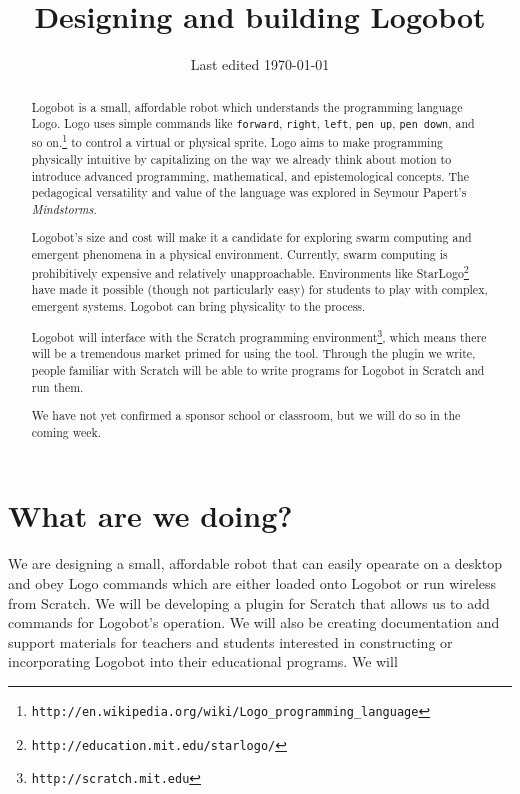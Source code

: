 \documentclass[11pt]{article}
\title{Designing and building Logobot}
\author{}
\date{Last edited \today}
\begin{document}
\maketitle
\begin{abstract}
Logobot is a small, affordable robot which understands the programming language Logo.  Logo uses simple commands like \texttt{forward}, \texttt{right}, \texttt{left}, \texttt{pen up}, \texttt{pen down}, and so on.\footnote{\texttt{http://en.wikipedia.org/wiki/Logo\_programming\_language}} to control a virtual or physical sprite.  Logo aims to make programming physically intuitive by capitalizing on the way we already think about motion to introduce advanced programming, mathematical, and epistemological concepts.  The pedagogical versatility and value of the language was explored in Seymour Papert's \textit{Mindstorms}.  

Logobot's size and cost will make it a candidate for exploring swarm computing and emergent phenomena in a physical environment.  Currently, swarm computing is prohibitively expensive and relatively unapproachable.  Environments like StarLogo\footnote{\texttt{http://education.mit.edu/starlogo/}} have made it possible (though not particularly easy) for students to play with complex, emergent systems.  Logobot can bring physicality to the process.

Logobot will interface with the Scratch programming environment\footnote{\texttt{http://scratch.mit.edu}}, which means there will be a tremendous market primed for using the tool.  Through the plugin we write, people familiar with Scratch will be able to write programs for Logobot in Scratch and run them.

We have not yet confirmed a sponsor school or classroom, but we will do so in the coming week.
\end{abstract}

\section{What are we doing?}
We are designing a small, affordable robot that can easily opearate on a desktop and obey Logo commands which are either loaded onto Logobot or run wireless from Scratch.  We will be developing a plugin for Scratch that allows us to add commands for Logobot's operation.  We will also be creating documentation and support materials for teachers and students interested in constructing or incorporating Logobot into their educational programs.  We will 
\end{document}
